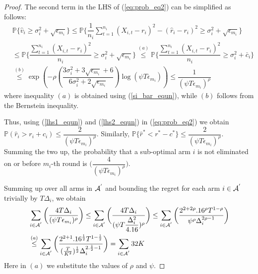 \begin{proof}
 
The second term in the LHS of (\ref{eq:prob_eq2}) can be simplified as follows:
\begin{align}
&\mathbb{P}\bigg\lbrace \hat{v}_{i}\geq \sigma_{i}^{2}+\sqrt{\epsilon_{m_{i}}}\bigg\rbrace\nonumber
\leq \mathbb{P}\bigg\lbrace \dfrac{1}{n_{i}}\sum_{t=1}^{n_{i}}(X_{i,t}-r_{i})^{2}-(\hat{r}_{i}-r_{i})^{2}\geq \sigma_{i}^{2}+\sqrt{\epsilon_{m_{i}}}\bigg\rbrace\nonumber\\
&\leq \mathbb{P}\bigg\lbrace \dfrac{\sum_{t=1}^{n_{i}}(X_{i,t}-r_{i})^{2}}{n_{i}}\geq \sigma_{i}^{2}+\sqrt{\epsilon_{m_{i}}} \bigg\rbrace\nonumber
\overset{(a)}{\leq} \mathbb{P}\bigg\lbrace \dfrac{\sum_{t=1}^{n_{i}}(X_{i,t}-r_{i})^{2}}{n_{i}}\geq \sigma_{i}^{2} + \bar{c}_i\bigg\rbrace \nonumber\\
&\overset{(b)}{\leq} \exp\left(- \rho \left(\dfrac{3\sigma_{i}^{2}+3\sqrt{\epsilon_{m_{i}}} + 6}{6\sigma_i^2 + 2\sqrt{\epsilon_{m_i}}} \right)\log(\psi  T\epsilon_{m_{i}})\right)
\le \dfrac{1}{(\psi  T\epsilon_{m_{i}})^{\rho}}
\label{lhs2_equn}
\end{align}
where inequality $(a)$ is obtained using (\ref{si_bar_equn}), while $(b)$ follows from the Bernstein inequality.
  
Thus, using (\ref{lhs1_equn}) and (\ref{lhs2_equn}) in (\ref{eq:prob_eq2}) we obtain $\mathbb{P}(\hat{r}_{i}> r_{i} + c_{i})\le \dfrac{2}{(\psi  T\epsilon_{m_{i}})^{\rho}}$. Similarly, $\mathbb{P}\lbrace\hat{r}^{*} < r^{*} - c^{*}\rbrace \leq \dfrac{2}{(\psi  T\epsilon_{m_{i}})^{\rho}}$. Summing the two up, the probability that a sub-optimal arm ${i}$ is not eliminated on or before $m_{i}$-th round is  $\bigg(\dfrac{4}{(\psi T\epsilon_{m_{i}})^{\rho}} \bigg)$.

Summing up over all arms in $\mathcal{A}^{'}$ and bounding the regret for each arm $i\in \mathcal{A}^{'}$ trivially by $T\Delta_{i}$, we obtain
   \begin{align*}
&\sum_{i\in \mathcal{A}^{'}}\bigg(\dfrac{4T\Delta_{i}}{(\psi T\epsilon_{m_{i}})^{\rho}}\bigg)
\leq\sum_{i\in \mathcal{A}^{'}}\bigg(\dfrac{4T\Delta_{i}}{(\psi T\dfrac{\Delta_{i}^{2}}{4.16})^{\rho}}\bigg)
\leq \sum_{i\in \mathcal{A}^{'}}\bigg(\dfrac{2^{2+2\rho}.16^{\rho}T^{1-\rho}}{\psi^{\rho}\Delta_{i}^{2\rho -1}}\bigg)\\  
& \overset{(a)}{\leq} \sum_{i\in \mathcal{A}^{'}}\bigg(\dfrac{2^{2+1}.16^{\frac{1}{2}}T^{1-\frac{1}{2}}}{(\frac{T}{K^2})^{\frac{1}{2}}\Delta_{i}^{2.\frac{1}{2} -1}}\bigg) = \sum_{i\in \mathcal{A}^{'}}  32 K  
   \end{align*}
   Here in $(a)$ we substitute the values of $\rho$ and $\psi$.


\end{proof}

